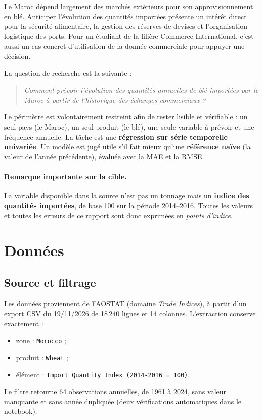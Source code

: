 \documentclass[11pt,a4paper]{article}
\begin{document}
Le Maroc dépend largement des marchés extérieurs pour son approvisionnement en blé. Anticiper l'évolution des quantités importées présente un intérêt direct pour la sécurité alimentaire, la gestion des réserves de devises et l'organisation logistique des ports. Pour un étudiant de la filière Commerce International, c'est aussi un cas concret d'utilisation de la donnée commerciale pour appuyer une décision.

La question de recherche est la suivante :

\begin{quote}
\emph{Comment prévoir l'évolution des quantités annuelles de blé importées par le Maroc à partir de l'historique des échanges commerciaux ?}
\end{quote}

Le périmètre est volontairement restreint afin de rester lisible et vérifiable : un seul pays (le Maroc), un seul produit (le blé), une seule variable à prévoir et une fréquence annuelle. La tâche est une \textbf{régression sur série temporelle univariée}. Un modèle est jugé utile s'il fait mieux qu'une \textbf{référence naïve} (la valeur de l'année précédente), évaluée avec la MAE et la RMSE.

\paragraph{Remarque importante sur la cible.} La variable disponible dans la source n'est pas un tonnage mais un \textbf{indice des quantités importées}, de base 100 sur la période 2014--2016. Toutes les valeurs et toutes les erreurs de ce rapport sont donc exprimées en \emph{points d'indice}.

\section{Données}

\subsection{Source et filtrage}
Les données proviennent de FAOSTAT (domaine \emph{Trade Indices}), à partir d'un export CSV du 19/11/2026 de 18\,240 lignes et 14 colonnes. L'extraction conserve exactement :
\begin{itemize}
  \item zone : \texttt{Morocco} ;
  \item produit : \texttt{Wheat} ;
  \item élément : \texttt{Import Quantity Index (2014-2016 = 100)}.
\end{itemize}
Le filtre retourne 64 observations annuelles, de 1961 à 2024, sans valeur manquante et sans année dupliquée (deux vérifications automatiques dans le notebook).
\end{document}
